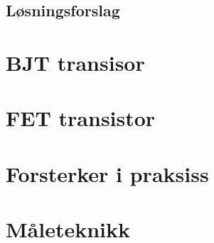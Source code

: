 \documentclass[12pt]{report}
\begin{document}
\subsection{Løsningsforslag}
\printsolutions[section]


\section{BJT transisor}

\section{FET transistor}

\section{Forsterker i praksiss}

\section{Måleteknikk}

\newpage

\printbibliography%

\appendix

\end{document}
